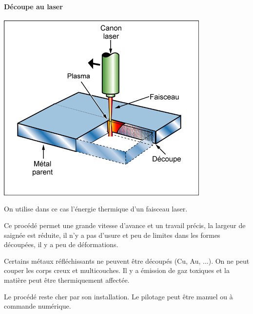 \documentclass[11pt,oneside]{article}
\begin{document}
\paragraph*{Découpe au laser}
\begin{minipage}[c]{.25\linewidth}
\begin{center}
\includegraphics[width=.9\textwidth]{png/laser}
\end{center}
\end{minipage} \hfill
\begin{minipage}[c]{.6\linewidth}
On utilise dans ce cas l'énergie thermique d'un faisceau laser.

Ce procédé permet une grande vitesse d'avance et un travail précis, la largeur de saignée est réduite, il n'y a pas d'usure et peu de limites dans les formes découpées, il y a peu de déformations.

Certains métaux réfléchissants ne peuvent être découpés (Cu, Au, ...). On ne peut couper les corps creux et multicouches. Il y a émission de gaz toxiques et la matière peut être thermiquement affectée. 

Le procédé reste cher par son installation. Le pilotage peut être manuel ou à commande numérique.
\end{minipage} 
\end{document}
